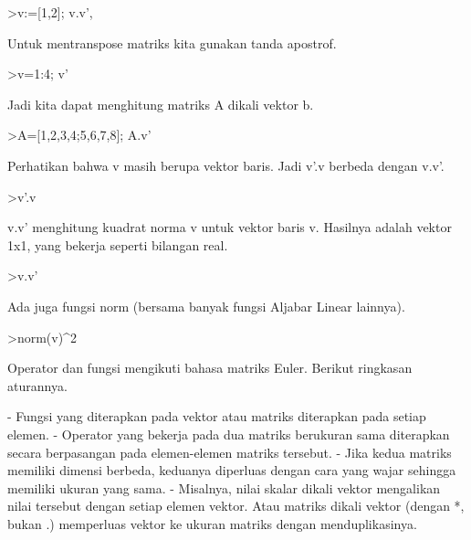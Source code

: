 \documentclass[a4paper,10pt]{article}
\begin{document}
\begin{eulernotebook}
\begin{euleroutput}
\end{euleroutput}
\begin{eulerprompt}
>v:=[1,2]; v.v', %
\end{eulerprompt}
\begin{euleroutput}
  
  Untuk mentranspose matriks kita gunakan tanda apostrof.
  
\end{euleroutput}
\begin{eulerprompt}
>v=1:4; v'
\end{eulerprompt}
\begin{euleroutput}
  
  Jadi kita dapat menghitung matriks A dikali vektor b.
  
\end{euleroutput}
\begin{eulerprompt}
>A=[1,2,3,4;5,6,7,8]; A.v'
\end{eulerprompt}
\begin{euleroutput}
  
  Perhatikan bahwa v masih berupa vektor baris. Jadi v'.v berbeda dengan v.v'.
  
\end{euleroutput}
\begin{eulerprompt}
>v'.v
\end{eulerprompt}
\begin{euleroutput}
  
  v.v' menghitung kuadrat norma v untuk vektor baris v. Hasilnya adalah vektor 1x1, yang bekerja seperti bilangan real.
  
\end{euleroutput}
\begin{eulerprompt}
>v.v'
\end{eulerprompt}
\begin{euleroutput}
  
  Ada juga fungsi norm (bersama banyak fungsi Aljabar Linear lainnya).
  
\end{euleroutput}
\begin{eulerprompt}
>norm(v)^2
\end{eulerprompt}
\begin{euleroutput}
  
  Operator dan fungsi mengikuti bahasa matriks Euler. Berikut ringkasan aturannya.
  
  - Fungsi yang diterapkan pada vektor atau matriks diterapkan pada setiap elemen.
  - Operator yang bekerja pada dua matriks berukuran sama diterapkan secara berpasangan pada elemen-elemen matriks tersebut.
  - Jika kedua matriks memiliki dimensi berbeda, keduanya diperluas dengan cara yang wajar sehingga memiliki ukuran yang sama.
  - Misalnya, nilai skalar dikali vektor mengalikan nilai tersebut dengan setiap elemen vektor. Atau matriks dikali vektor (dengan *, bukan .) memperluas vektor ke ukuran matriks dengan menduplikasinya.
  

\end{euleroutput}
\end{eulernotebook}
\end{document}
